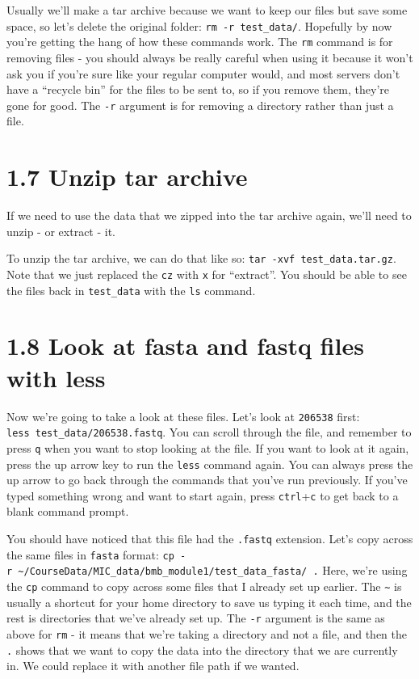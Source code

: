 \documentclass[
]{book}
\begin{document}
Usually we'll make a tar archive because we want to keep our files but save some space, so let's delete the original folder: \texttt{rm\ -r\ test\_data/}. Hopefully by now you're getting the hang of how these commands work. The \texttt{rm} command is for removing files - you should always be really careful when using it because it won't ask you if you're sure like your regular computer would, and most servers don't have a ``recycle bin'' for the files to be sent to, so if you remove them, they're gone for good. The \texttt{-r} argument is for removing a directory rather than just a file.

\section{1.7 Unzip tar archive}\label{unzip-tar-archive}

If we need to use the data that we zipped into the tar archive again, we'll need to unzip - or extract - it.

To unzip the tar archive, we can do that like so: \texttt{tar\ -xvf\ test\_data.tar.gz}. Note that we just replaced the \texttt{cz} with \texttt{x} for ``extract''. You should be able to see the files back in \texttt{test\_data} with the \texttt{ls} command.

\section{1.8 Look at fasta and fastq files with less}\label{look-at-fasta-and-fastq-files-with-less}

Now we're going to take a look at these files. Let's look at \texttt{206538} first: \texttt{less\ test\_data/206538.fastq}. You can scroll through the file, and remember to press \texttt{q} when you want to stop looking at the file. If you want to look at it again, press the up arrow key to run the \texttt{less} command again. You can always press the up arrow to go back through the commands that you've run previously. If you've typed something wrong and want to start again, press \texttt{ctrl}+\texttt{c} to get back to a blank command prompt.

You should have noticed that this file had the \texttt{.fastq} extension. Let's copy across the same files in \texttt{fasta} format: \texttt{cp\ -r\ \textasciitilde{}/CourseData/MIC\_data/bmb\_module1/test\_data\_fasta/\ .}
Here, we're using the \texttt{cp} command to copy across some files that I already set up earlier. The \texttt{\textasciitilde{}} is usually a shortcut for your home directory to save us typing it each time, and the rest is directories that we've already set up. The \texttt{-r} argument is the same as above for \texttt{rm} - it means that we're taking a directory and not a file, and then the \texttt{.} shows that we want to copy the data into the directory that we are currently in. We could replace it with another file path if we wanted.
\end{document}
